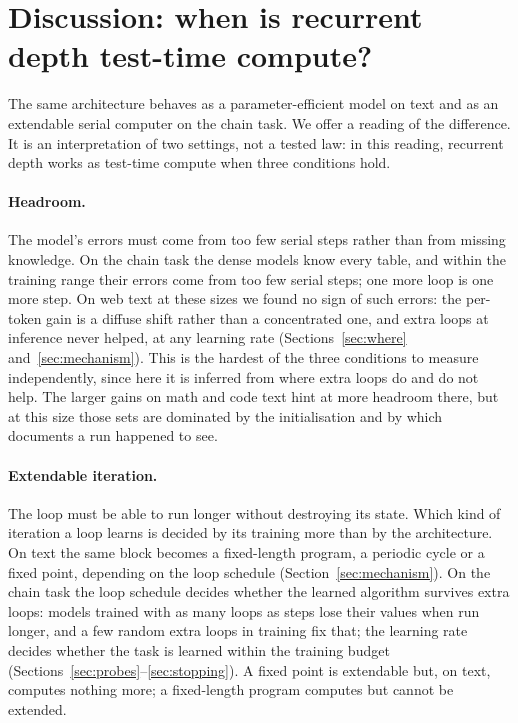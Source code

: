 \section{Discussion: when is recurrent depth test-time compute?}
\label{sec:discussion}

The same architecture behaves as a parameter-efficient model on text and as an extendable serial computer on the
chain task. We offer a reading of the difference. It is an interpretation of two settings, not
a tested law: in this reading, recurrent depth works as test-time compute when three conditions hold.

\paragraph{Headroom.} The model's errors must come from too few serial steps rather than from missing knowledge. On
the chain task the dense models know every table, and within the training range their errors come from too few serial
steps; one more loop is one more step. On web text at
these sizes we found no sign of such errors: the per-token gain is a diffuse shift rather than a concentrated one, and
extra loops at inference never helped, at any learning rate (Sections~\ref{sec:where} and~\ref{sec:mechanism}). This is
the hardest of the three conditions to measure independently, since here it is inferred from where extra loops do and
do not help. The larger gains on math and code text hint at more headroom there, but at this size those sets are
dominated by the initialisation and by which documents a run happened to see.

\paragraph{Extendable iteration.} The loop must be able to run longer without destroying its state. Which kind of
iteration a loop learns is decided by its training more than by the architecture. On text the same block becomes a
fixed-length program, a periodic cycle or a fixed point, depending on the loop schedule (Section~\ref{sec:mechanism}).
On the chain task the loop schedule decides whether the learned algorithm survives extra loops: models trained with as
many loops as steps lose their values when run longer, and a few random extra loops in training fix that; the learning
rate decides whether the task is learned within the training budget (Sections~\ref{sec:probes}--\ref{sec:stopping}). A fixed point is
extendable but, on text, computes nothing more; a fixed-length program computes but cannot be extended.


